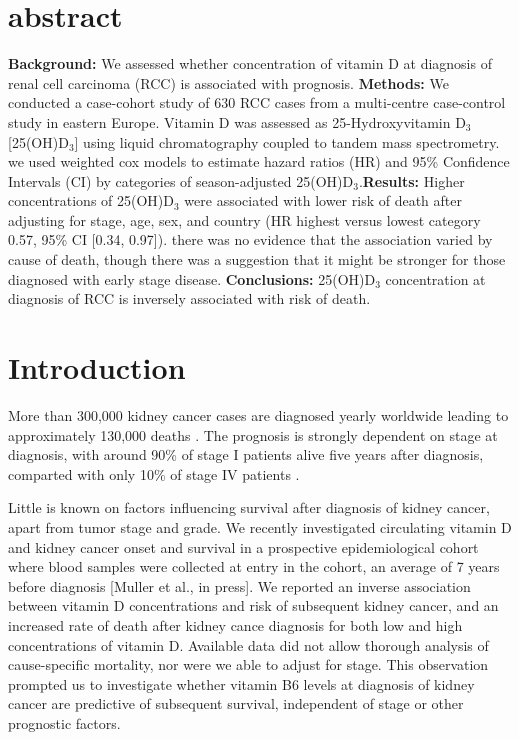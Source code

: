 \documentclass[a4paper,11pt]{article}
\begin{document}
\section{abstract}
\noindent \textbf{Background:} We assessed whether concentration of vitamin D 
at diagnosis of renal cell carcinoma (RCC) is associated with prognosis.  
\newline 
\textbf{Methods:} We conducted a case-cohort study of 630 RCC cases from a 
multi-centre case-control study in eastern Europe. Vitamin D was assessed as 
25-Hydroxyvitamin D$_3$ [25(OH)D$_3$] using liquid chromatography coupled to 
tandem mass spectrometry. we used weighted cox models to estimate hazard ratios 
(HR) and 95\% Confidence Intervals (CI) by categories of season-adjusted 
25(OH)D$_3$.\newline \textbf{Results:} Higher concentrations of 25(OH)D$_3$ 
were 
associated with lower risk of death after adjusting for stage, age, sex, and 
country (HR highest versus lowest category 0.57, 95\% CI [0.34, 0.97]). there 
was no evidence that the association varied by cause of death, though there was 
a suggestion that it might be stronger for those diagnosed with early stage 
disease. \newline 
\textbf{Conclusions:} 25(OH)D$_3$ concentration at diagnosis 
of RCC is inversely associated with risk of death. \newline


\section*{Introduction}
More than 300,000 kidney cancer cases are diagnosed yearly worldwide leading to 
approximately 130,000 deaths \cite{ferlay_cancer_2013}. The prognosis is 
strongly dependent on stage at diagnosis, with around 90\% of stage I patients 
alive five years after diagnosis, comparted with only 10\% of stage IV patients 
\cite{CRUK_kidney_2014}.

Little is known on factors influencing survival after diagnosis of kidney 
cancer, apart from tumor stage and grade. We recently investigated circulating 
vitamin D and kidney cancer onset and survival in a prospective epidemiological 
cohort where blood samples were collected at entry in the cohort, an average 
of 7 years before diagnosis [Muller et al., in press]. We reported an inverse 
association between vitamin D concentrations and risk of subsequent kidney 
cancer, and an increased rate of death after kidney cance diagnosis for both 
low and high concentrations of vitamin D. Available data did not allow thorough 
analysis of cause-specific mortality, nor were we able to adjust for stage. This 
observation prompted us to investigate whether vitamin B6 levels at diagnosis of 
kidney cancer are predictive of subsequent survival, independent of stage or 
other prognostic factors.   
\end{document}
